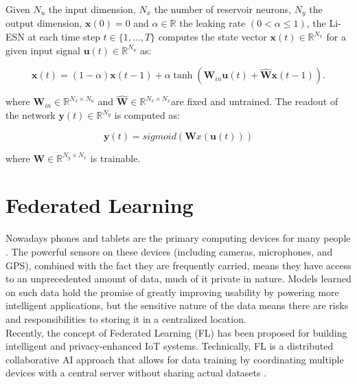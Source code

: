 \begin{definition}[Li-ESN]\label{def:liesn}
Given $N_u$ the input dimension, $N_x$ the number of reservoir neurons, $N_y$ the output dimension, $\textbf{x}(0)=0$ and $\alpha \in \mathbb{R}$ the leaking rate $(0<\alpha\leq1)$, the Li-ESN at each time step $t \in \{1,\dots, T\}$ computes the state vector $\textbf{x}(t) \in \mathbb{R}^{N_x}$ for a given input signal $\textbf{u}(t) \in \mathbb{R}^{N_u}$ as:

\begin{equation}\nonumber
    \textbf{x}(t)=(1-\alpha)\textbf{x}(t-1)+\alpha \tanh(\textbf{W}_{in}\textbf{u}(t)+\widehat{\textbf{W}}\textbf{x}(t-1)).
\end{equation}

where $\textbf{W}_{in} \in \mathbb{R}^{N_x \times N_u}$ and $\widehat{\textbf{W}} \in \mathbb{R}^{N_x \times N_x}$are fixed and untrained. The readout of the network $\textbf{y}(t) \in \mathbb{R}^{N_y}$ is computed as:

\begin{equation}\nonumber
    \textbf{y}(t)=sigmoid(\textbf{W}x(\textbf{u}(t)))
\end{equation}

where $\textbf{W} \in \mathbb{R}^{N_y \times N_x}$ is trainable.
\end{definition}


\section{Federated Learning}

Nowadays phones and tablets are the primary computing devices for many people \cite{poushter2016smartphone}\cite{anderson2015technology}. The powerful sensors on these devices (including cameras, microphones, and GPS), combined with the fact they are frequently carried, means they have access to an unprecedented amount of data, much of it private in nature. Models learned on such data hold the promise of greatly improving usability by powering more intelligent applications, but the sensitive nature of the data means there are risks and responsibilities to storing it in a centralized location. \\

Recently, the concept of Federated Learning (FL) has been proposed for building intelligent and privacy-enhanced IoT systems. Technically, FL is a distributed collaborative AI approach that allows for data training by coordinating multiple devices with a central server without sharing actual datasets \cite{konevcny2016federated}. \\

